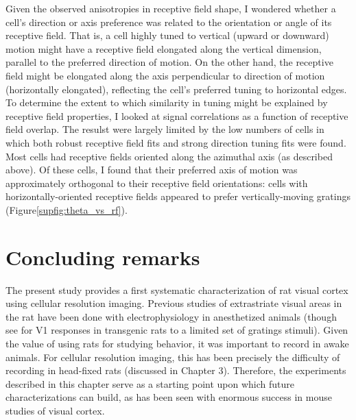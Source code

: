 Given the observed anisotropies in receptive field shape, I wondered whether a cell's direction or axis preference was related to the orientation or angle of its receptive field. That is, a cell highly tuned to vertical (upward or downward) motion might have a receptive field elongated along the vertical dimension, parallel to the preferred direction of motion. On the other hand, the receptive field might be elongated along the axis perpendicular to direction of motion (horizontally elongated), reflecting the cell's preferred tuning to horizontal edges. To determine the extent to which similarity in tuning might be explained by receptive field properties, I looked at signal correlations as a function of receptive field overlap. The resulst were largely limited by the low numbers of cells in which both robust receptive field fits and strong direction tuning fits were found. Most cells had receptive fields oriented along the azimuthal axis (as described above). Of these cells, I found that their preferred axis of motion was approximately orthogonal to their receptive field orientations:  cells with horizontally-oriented receptive fields appeared to prefer  vertically-moving gratings (Figure\ref{supfig:theta_vs_rf}). 


\section{Concluding remarks}
The present study provides a first systematic characterization of rat visual cortex using cellular resolution imaging. Previous studies of extrastriate visual areas in the rat have been done with electrophysiology in anesthetized animals\cite{Girman1999a, Vermaercke2014, Tafazoli2017} (though see \citet{Scott2018} for V1 responses in transgenic rats to a limited set of gratings stimuli). Given the value of using rats for studying behavior, it was important to record in awake animals. For cellular resolution imaging, this has been precisely the difficulty of recording in head-fixed rats (discussed in Chapter 3). Therefore, the experiments described in this chapter serve as a starting point upon which future characterizations can build, as has been seen with enormous success in mouse studies of visual cortex.

